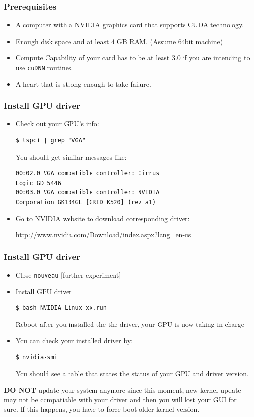 \documentclass{beamer}
\begin{document}
\begin{frame}
\frametitle{Prerequisites}

\begin{itemize}
\item[\ding{112}] A computer with a NVIDIA graphics card that supports CUDA technology.
\item[\ding{112}] Enough disk space and at least 4 GB RAM. (Assume 64bit machine)
\item[\ding{112}] Compute Capability of your card has to be at least 3.0 if you are intending to use \texttt{cuDNN} routines.
\item[\ding{112}] A heart that is strong enough to take failure.
\end{itemize}

\end{frame}

\begin{frame}[fragile]
\frametitle{Install GPU driver}

\begin{itemize}
\item[\ding{43}] Check out your GPU's info:
\begin{verbatim}
$ lspci | grep "VGA"
\end{verbatim}
You should get similar messages like:
\begin{verbatim}
00:02.0 VGA compatible controller: Cirrus 
Logic GD 5446
00:03.0 VGA compatible controller: NVIDIA 
Corporation GK104GL [GRID K520] (rev a1)
\end{verbatim}

\item[\ding{43}] Go to NVIDIA website to download corresponding driver:

\url{http://www.nvidia.com/Download/index.aspx?lang=en-us}
\end{itemize}

\end{frame}

\begin{frame}[fragile]
\frametitle{Install GPU driver}

\begin{itemize}
\item[\ding{43}] Close \texttt{nouveau} [further experiment]
\item[\ding{43}] Install GPU driver
\begin{verbatim}
$ bash NVIDIA-Linux-xx.run
\end{verbatim}
Reboot after you installed the the driver, your GPU is now taking in charge

\item[\ding{43}] You can check your installed driver by:
\begin{verbatim}
$ nvidia-smi
\end{verbatim}
You should see a table that states the status of your GPU and driver version.
\end{itemize}

\textbf{DO NOT} update your system anymore since this moment, new kernel update may not be compatiable with your driver and then you will lost your GUI for sure. If this happens, you have to force boot older kernel version.
\end{frame}
\end{document}
